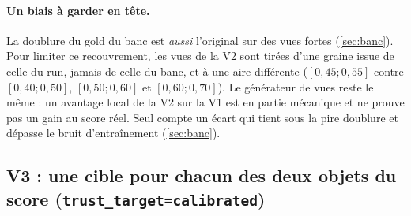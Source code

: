 \documentclass[11pt,a4paper]{article}
\newcommand{\code}[1]{\texttt{#1}}
\begin{document}
\paragraph{Un biais à garder en tête.} La doublure du gold du banc est \emph{aussi} l'original sur
des vues fortes (\cref{sec:banc}). Pour limiter ce recouvrement, les vues de la V2 sont tirées
d'une graine issue de celle du run, jamais de celle du banc, et à une aire différente ($[0{,}45;
0{,}55]$ contre $[0{,}40;0{,}50]$, $[0{,}50;0{,}60]$ et $[0{,}60;0{,}70]$). Le générateur de vues
reste le même : un avantage local de la V2 sur la V1 est en partie mécanique et ne prouve pas un
gain au score réel. Seul compte un écart qui tient sous la pire doublure et dépasse le bruit
d'entraînement (\cref{sec:banc}).

\subsection{V3 : une cible pour chacun des deux objets du score (\code{trust\_target=calibrated})}\label{sec:trustv3}
\end{document}
